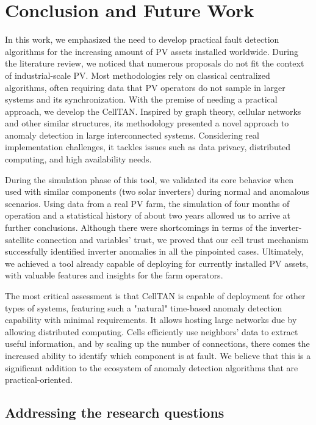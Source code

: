 \chapter{Conclusion and Future Work} \label{chap:concl}

In this work, we emphasized the need to develop practical fault detection algorithms for the increasing amount of PV assets installed worldwide. During the literature review, we noticed that numerous proposals do not fit the context of industrial-scale PV. Most methodologies rely on classical centralized algorithms, often requiring data that PV operators do not sample in larger systems and its synchronization.
With the premise of needing a practical approach, we develop the CellTAN. Inspired by graph theory, cellular networks and other similar structures, its methodology presented a novel approach to anomaly detection in large interconnected systems. Considering real implementation challenges, it tackles issues such as data privacy, distributed computing, and high availability needs.

During the simulation phase of this tool, we validated its core behavior when used with similar components (two solar inverters) during normal and anomalous scenarios. Using data from a real PV farm, the simulation of four months of operation and a statistical history of about two years allowed us to arrive at further conclusions. Although there were shortcomings in terms of the inverter-satellite connection and variables' trust, we proved that our cell trust mechanism successfully identified inverter anomalies in all the pinpointed cases. Ultimately, we achieved a tool already capable of deploying for currently installed PV assets, with valuable features and insights for the farm operators.

The most critical assessment is that CellTAN is capable of deployment for other types of systems, featuring such a "natural" time-based anomaly detection capability with minimal requirements. It allows hosting large networks due by allowing distributed computing. Cells efficiently use neighbors' data to extract useful information, and by scaling up the number of connections, there comes the increased ability to identify which component is at fault.
We believe that this is a significant addition to the ecosystem of anomaly detection algorithms that are practical-oriented.

\section{Addressing the research questions}



